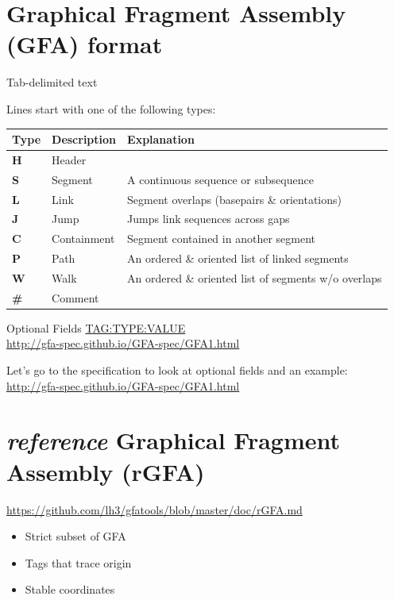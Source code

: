 \documentclass[
]{book}
\providecommand{\tightlist}{%
  \setlength{\itemsep}{0pt}\setlength{\parskip}{0pt}}
\begin{document}
\hypertarget{graphical-fragment-assembly-gfa-format-1}{%
\section{Graphical Fragment Assembly (GFA) format}\label{graphical-fragment-assembly-gfa-format-1}}

Tab-delimited text

Lines start with one of the following types:

\begin{longtable}[]{@{}lll@{}}
\toprule()
Type & Description & Explanation \\
\midrule()
\endhead
\textbf{H} & Header & \\
\textbf{S} & Segment & A continuous sequence or subsequence \\
\textbf{L} & Link & Segment overlaps (basepairs \& orientations) \\
\textbf{J} & Jump & Jumps link sequences across gaps \\
\textbf{C} & Containment & Segment contained in another segment \\
\textbf{P} & Path & An ordered \& oriented list of linked segments \\
\textbf{W} & Walk & An ordered \& oriented list of segments w/o overlaps \\
\textbf{\#} & Comment & \\
\bottomrule()
\end{longtable}

Optional Fields \url{TAG:TYPE:VALUE}\\
\url{http://gfa-spec.github.io/GFA-spec/GFA1.html}

Let's go to the specification to look at optional fields and an example:\\
\url{http://gfa-spec.github.io/GFA-spec/GFA1.html}

\hypertarget{reference-graphical-fragment-assembly-rgfa}{%
\section{\texorpdfstring{\emph{reference} Graphical Fragment Assembly (rGFA)}{reference Graphical Fragment Assembly (rGFA)}}\label{reference-graphical-fragment-assembly-rgfa}}

\url{https://github.com/lh3/gfatools/blob/master/doc/rGFA.md}

\begin{itemize}
\tightlist
\item
  Strict subset of GFA
\item
  Tags that trace origin
\item
  Stable coordinates
\end{itemize}
\end{document}
